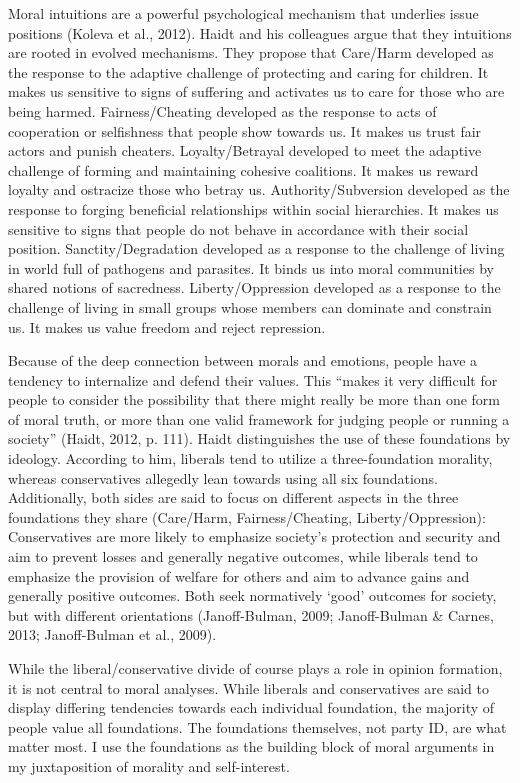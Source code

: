 \documentclass[12pt,econ]{sources/authesis}
\begin{document}
Moral intuitions are a powerful psychological mechanism that underlies issue positions (Koleva et al., 2012). Haidt and his colleagues argue that they intuitions are rooted in evolved mechanisms. They propose that Care/Harm developed as the response to the adaptive challenge of protecting and caring for children. It makes us sensitive to signs of suffering and activates us to care for those who are being harmed. Fairness/Cheating developed as the response to acts of cooperation or selfishness that people show towards us. It makes us trust fair actors and punish cheaters. Loyalty/Betrayal developed to meet the adaptive challenge of forming and maintaining cohesive coalitions. It makes us reward loyalty and ostracize those who betray us. Authority/Subversion developed as the response to forging beneficial relationships within social hierarchies. It makes us sensitive to signs that people do not behave in accordance with their social position. Sanctity/Degradation developed as a response to the challenge of living in world full of pathogens and parasites. It binds us into moral communities by shared notions of sacredness. Liberty/Oppression developed as a response to the challenge of living in small groups whose members can dominate and constrain us. It makes us value freedom and reject repression.

Because of the deep connection between morals and emotions, people have a tendency to internalize and defend their values. This ``makes it very difficult for people to consider the possibility that there might really be more than one form of moral truth, or more than one valid framework for judging people or running a society'' (Haidt, 2012, p. 111). Haidt distinguishes the use of these foundations by ideology. According to him, liberals tend to utilize a three-foundation morality, whereas conservatives allegedly lean towards using all six foundations. Additionally, both sides are said to focus on different aspects in the three foundations they share (Care/Harm, Fairness/Cheating, Liberty/Oppression): Conservatives are more likely to emphasize society's protection and security and aim to prevent losses and generally negative outcomes, while liberals tend to emphasize the provision of welfare for others and aim to advance gains and generally positive outcomes. Both seek normatively `good' outcomes for society, but with different orientations (Janoff-Bulman, 2009; Janoff-Bulman \& Carnes, 2013; Janoff-Bulman et al., 2009).

While the liberal/conservative divide of course plays a role in opinion formation, it is not central to moral analyses. While liberals and conservatives are said to display differing tendencies towards each individual foundation, the majority of people value all foundations. The foundations themselves, not party ID, are what matter most. I use the foundations as the building block of moral arguments in my juxtaposition of morality and self-interest.
\end{document}
